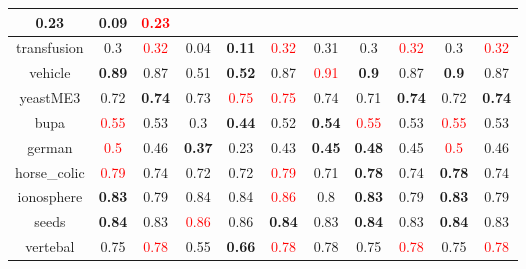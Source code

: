 \documentclass{article}%
\begin{document}
\begin{tabular}{c|cccccccccc}
{0.23
}&0.09&\textcolor{red}{ 
0.23
}\\%
\hline%
transfusion&0.3&\textcolor{red}{ 
0.32
}&0.04&\textbf{0.11}&\textcolor{red}{ 
0.32
}&0.31&0.3&\textcolor{red}{ 
0.32
}&0.3&\textcolor{red}{ 
0.32
}\\%
\hline%
vehicle&\textbf{0.89}&0.87&0.51&\textbf{0.52}&0.87&\textcolor{red}{ 
0.91
}&\textbf{0.9}&0.87&\textbf{0.9}&0.87\\%
\hline%
yeastME3&0.72&\textbf{0.74}&0.73&\textcolor{red}{ 
0.75
}&\textcolor{red}{ 
0.75
}&0.74&0.71&\textbf{0.74}&0.72&\textbf{0.74}\\%
\hline%
bupa&\textcolor{red}{ 
0.55
}&0.53&0.3&\textbf{0.44}&0.52&\textbf{0.54}&\textcolor{red}{ 
0.55
}&0.53&\textcolor{red}{ 
0.55
}&0.53\\%
\hline%
german&\textcolor{red}{ 
0.5
}&0.46&\textbf{0.37}&0.23&0.43&\textbf{0.45}&\textbf{0.48}&0.45&\textcolor{red}{ 
0.5
}&0.46\\%
\hline%
horse\_colic&\textcolor{red}{ 
0.79
}&0.74&0.72&0.72&\textcolor{red}{ 
0.79
}&0.71&\textbf{0.78}&0.74&\textbf{0.78}&0.74\\%
\hline%
ionosphere&\textbf{0.83}&0.79&0.84&0.84&\textcolor{red}{ 
0.86
}&0.8&\textbf{0.83}&0.79&\textbf{0.83}&0.79\\%
\hline%
seeds&\textbf{0.84}&0.83&\textcolor{red}{ 
0.86
}&0.86&\textbf{0.84}&0.83&\textbf{0.84}&0.83&\textbf{0.84}&0.83\\%
\hline%
vertebal&0.75&\textcolor{red}{ 
0.78
}&0.55&\textbf{0.66}&\textcolor{red}{ 
0.78
}&0.78&0.75&\textcolor{red}{ 
0.78
}&0.75&\textcolor{red}{ 
0.78
}\\%
\hline%
\end{tabular}

%
\end{document}
